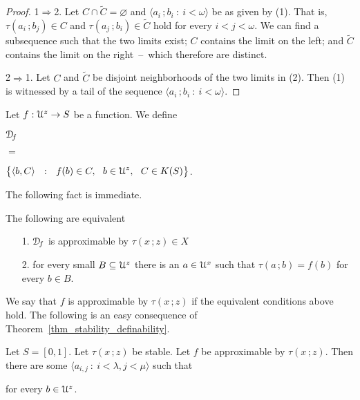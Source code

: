   \noindent\llap{\textcolor{red}{\Large\warning}\kern1.5ex}\ignorespaces%
  \vspace{-\baselineskip-\parskip}
\begin{proof}
  1$\Rightarrow$2.
  Let $C\cap\tilde C=\varnothing$ and $\langle a_i\,;b_i\ :\ i<\omega\rangle$ be as given by (1).
  That is, $\tau(a_i\,;b_j)\in C$ and $\tau(a_j\,;b_i)\in \tilde C$ hold for every $i<j<\omega$.
  We can find a subsequence such that the two limits exist; $C$ contains the limit on the left; and $\tilde C$ contains the limit on the right~--~which therefore are distinct.%

  2$\Rightarrow$1. Let $C$ and $\tilde C$ be disjoint neighborhoods of the two limits in (2).
  Then (1) is witnessed by a tail of the sequence $\langle a_i\,;b_i\ :\ i<\omega\rangle$.
\end{proof}


Let $f:{\EuScript U}^{z}\to S$ be a function.
We define
{\def\medrel#1{\parbox{5ex}{\hfil $#1$}}
\def\ceq#1#2#3{\parbox[t]{15ex}{$\displaystyle #1$}\medrel{#2}{$\displaystyle #3$}}

\ceq{\hfill{\EuScript D\!}_f}{=}{\big\{\langle b,C\rangle\ \ :\ \ f(b)\in C,\ \ b\in{\EuScript U}^{z},\ \ C\in K(S)\big\}}.}


The following fact is immediate.

\begin{fact}
  The following are equivalent
  \begin{itemize}
    \item [1.] ${\EuScript D\!}_f$ is approximable by $\tau(x\,;z)\in X$
    \item [2.] for every small $B\subseteq{\EuScript U}^z$ there is an $a\in{\EuScript U}^x$ such that $\tau(a\,;b)=f(b)$ for every $b\in B$.\smallskip
  \end{itemize}
\end{fact}

We say that $f$ is approximable by $\tau(x\,;z)$ if the equivalent conditions above hold.
The following is an easy consequence of Theorem~\ref{thm_stability_definability}.

\begin{theorem}
  Let $S=[0,1]$.
  Let $\tau(x\,;z)$ be stable.
  Let $f$ be approximable by $\tau(x\,;z)$.
  Then there are some $\langle a_{i,j}\ :\ i<\lambda,j<\mu\rangle$ such that \smallskip

  \hfill for every $b\in{\EuScript U}^z$.
  
\end{theorem}


